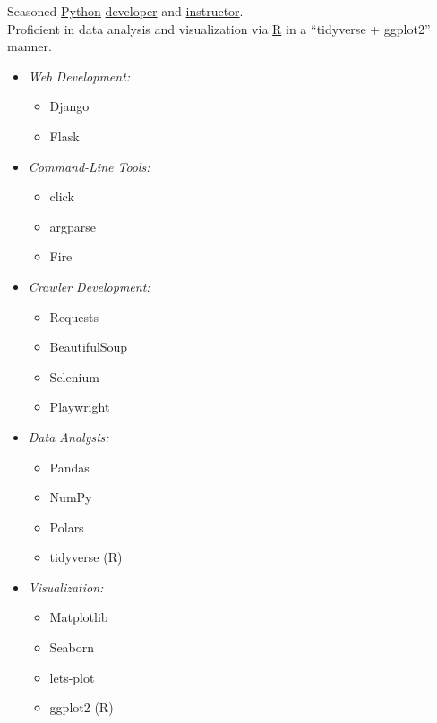 Seasoned \underline{Python} \href{https://github.com/hermanzhaozzzz}{developer} 
and \href{https://www.bioinfo.info/p/t_pc/goods_pc_detail/goods_detail/course_2SvfNlIVzrKfOcexHk9Nute5Bhd}{instructor}.\\
Proficient in data analysis and visualization via \underline{R} in a ``tidyverse + ggplot2'' manner.
\vspace{-1em}
\begin{multicols}{3} %
\begin{itemize}  
    \item \textit{Web Development:}  
    \begin{itemize}
        \item Django  
        \item Flask  
    \end{itemize}  
  
    \item \textit{Command-Line Tools:}  
    \begin{itemize}  
        \item click  
        \item argparse  
        \item Fire  
    \end{itemize}  
  
    \item \textit{Crawler Development:}  
    \begin{itemize}  
        \item Requests  
        \item BeautifulSoup  
        \item Selenium  
        \item Playwright  
    \end{itemize}  
  
    \item \textit{Data Analysis:}  
    \begin{itemize}  
        \item Pandas  
        \item NumPy  
        \item Polars  
        \item tidyverse (R)  
    \end{itemize}  
\end{itemize}  
  
\columnbreak %
  
\begin{itemize}  
    \item \textit{Visualization:}  
    \begin{itemize}  
        \item Matplotlib  
        \item Seaborn  
        \item lets-plot  
        \item ggplot2 (R)  
    \end{itemize}  


\end{itemize}
\end{multicols}
